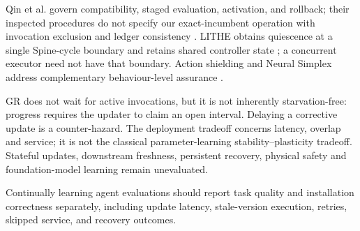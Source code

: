 \documentclass{article}
\begin{document}
Qin et al. govern compatibility, staged evaluation, activation, and rollback; their inspected procedures do not specify our exact-incumbent operation with invocation exclusion and ledger consistency \citep{qin2026governed}. LITHE obtains quiescence at a single Spine-cycle boundary and retains shared controller state \citep{lim2026lithe}; a concurrent executor need not have that boundary. Action shielding and Neural Simplex address complementary behaviour-level assurance \citep{alshiekh2018shielding,phan2020neural}.

GR does not wait for active invocations, but it is not inherently starvation-free: progress requires the updater to claim an open interval. Delaying a corrective update is a counter-hazard. The deployment tradeoff concerns latency, overlap and service; it is not the classical parameter-learning stability--plasticity tradeoff. Stateful updates, downstream freshness, persistent recovery, physical safety and foundation-model learning remain unevaluated.

Continually learning agent evaluations should report task quality and installation correctness separately, including update latency, stale-version execution, retries, skipped service, and recovery outcomes.
\clearpage


\clearpage
\appendix

\end{document}
